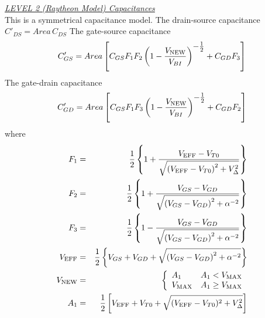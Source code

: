 \noindent\underline{\sl LEVEL 2 (Raytheon Model) Capacitances}
\label{b:raytheon:capacitance}
\\[0.1in]
This is a symmetrical capacitance model.  The drain-source capacitance
$C'_{DS} = Area\,C_{DS}$\inlineeq
The gate-source capacitance
\begin{equation}
C'_{GS} = Area\left[C_{GS}F_1F_2\left(1 - {{\textstyle V_{\mbox{\scriptsize NEW}}}
   \over{\textstyle V_{BI}}}\right)^{\textstyle - \frac{1}{2}}
   + C_{GD}F_3\right]
\end{equation}
The gate-drain capacitance
\begin{equation}
C'_{GD} = Area\left[C_{GS}F_1F_3\left(1 - {{\textstyle V_{\mbox{\scriptsize NEW}}}
   \over{\textstyle V_{BI}}}\right)^{\textstyle - \frac{1}{2}}
   + C_{GD}F_2\right]
\end{equation}
where
\begin{eqnarray}
F_1 & = & {{\textstyle 1}\over{\textstyle 2}} \left\{ 1 +
    {{\textstyle V_{\ms{EFF}}-V_{T0}}
    \over{\textstyle\sqrt{\left( V_{\ms{EFF}}-V_{T0}\right)^2+V_{\Delta}^2}}}\right\}\\
F_2 & = & {{\textstyle 1}\over{\textstyle 2}} \left\{ 1 +
    {{\textstyle V_{GS}-V_{GD}}
    \over{\textstyle\sqrt{\left( V_{GS}-V_{GD}\right)^2+\alpha^{-2}}}}\right\}\\
F_3 & = & {{\textstyle 1}\over{\textstyle 2}} \left\{ 1 -
    {{\textstyle V_{GS}-V_{GD}}
    \over{\textstyle\sqrt{\left( V_{GS}-V_{GD}\right)^2+\alpha^{-2}}}}\right\}\\
V_{\ms{EFF}} & = & {{\textstyle 1}\over{\textstyle 2}} \left\{V_{GS}+V_{GD}+
    \sqrt{\left( V_{GS}-V_{GD}\right)^2+\alpha^{-2}}\right\}\\
V_{\ms{NEW}} & = & \left\{ \begin{array}{ll}
    A_1 & A_1 < V_{\ms{MAX}} \\
    V_{\ms{MAX}} & A_1 \ge V_{\ms{MAX}} \\
      \end{array} \right. \\ %
    A_1 & = & \frac{1}{2}\left[V_{\ms{EFF}} + V_{T0}
          + \sqrt{(V_{\ms{EFF}}-V_{T0})^2+V_{\Delta}^2}\right]
\end{eqnarray}

